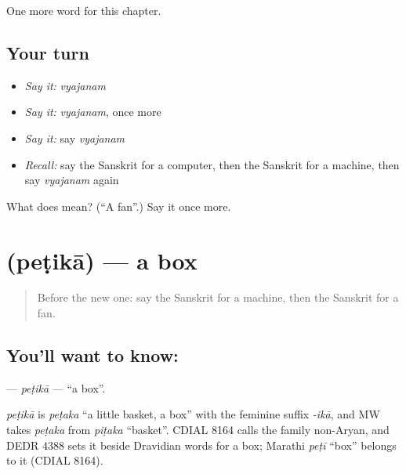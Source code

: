 \begin{grammarlens}[title={What you've built}]
One more word for this chapter.
\end{grammarlens}

\subsection*{Your turn}
\begin{itemize}
\raggedright
  \item \emph{Say it:} \emph{vyajanam}
  \item \emph{Say it:} \emph{vyajanam}, once more
  \item \emph{Say it:} say \emph{vyajanam}
  \item \emph{Recall:} say the Sanskrit for a computer, then the Sanskrit for a machine, then say \emph{vyajanam} again
\end{itemize}

\begin{tcolorbox}[breakable,colback=teal!4,colframe=teal!35!black,title={Before you move on}]
What does  mean? (\textquotedblleft{}A fan\textquotedblright{}.) Say it once more.
\end{tcolorbox}
\section[\texorpdfstring{\sk{पेटिका} (peṭikā)}{पेटिका (peṭikā)}]{ (peṭikā) — a box}

\label{lesson:SA-C105-petika}



\begin{quote}
Before the new one: say the Sanskrit for a machine, then the Sanskrit for a fan.
\end{quote}

\subsection*{You'll want to know: }
\textbf{} — \emph{peṭikā} — \textquotedblleft{}a box\textquotedblright{}.

\begin{cousinweb}
\emph{peṭikā} is \emph{peṭaka} \textquotedblleft{}a little basket, a box\textquotedblright{} with the feminine suffix \emph{-ikā}, and MW takes \emph{peṭaka} from \emph{piṭaka} \textquotedblleft{}basket\textquotedblright{}. CDIAL 8164 calls the family non-Aryan, and DEDR 4388 sets it beside Dravidian words for a box; Marathi \emph{peṭī} \textquotedblleft{}box\textquotedblright{} belongs to it (CDIAL 8164).
\end{cousinweb}

